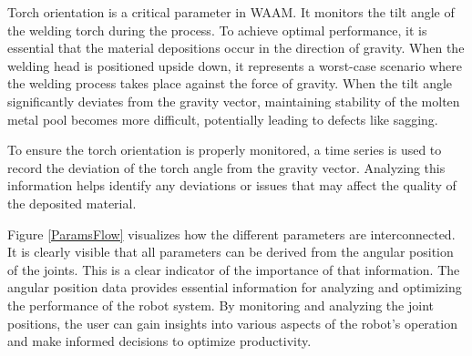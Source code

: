 


Torch orientation is a critical parameter in WAAM. It monitors the tilt angle of the welding torch during the process. To achieve optimal performance, it is essential that the material depositions occur in the direction of gravity. When the welding head is positioned upside down, it represents a worst-case scenario where the welding process takes place against the force of gravity.
When the tilt angle significantly deviates from the gravity vector, maintaining stability of the molten metal pool becomes more difficult, potentially leading to defects like sagging. 

To ensure the torch orientation is properly monitored, a time series is used to record the deviation of the torch angle from the gravity vector. Analyzing this information helps identify any deviations or issues that may affect the quality of the deposited material. 






Figure \ref{ParamsFlow} visualizes how the different parameters are interconnected. It is clearly visible that all parameters can be derived from the angular position of the joints. This is a clear indicator of the importance of that information. The angular position data provides essential information for analyzing and optimizing the performance of the robot system. By monitoring and analyzing the joint positions, the user can gain insights into various aspects of the robot's operation and make informed decisions to optimize productivity.\newline




